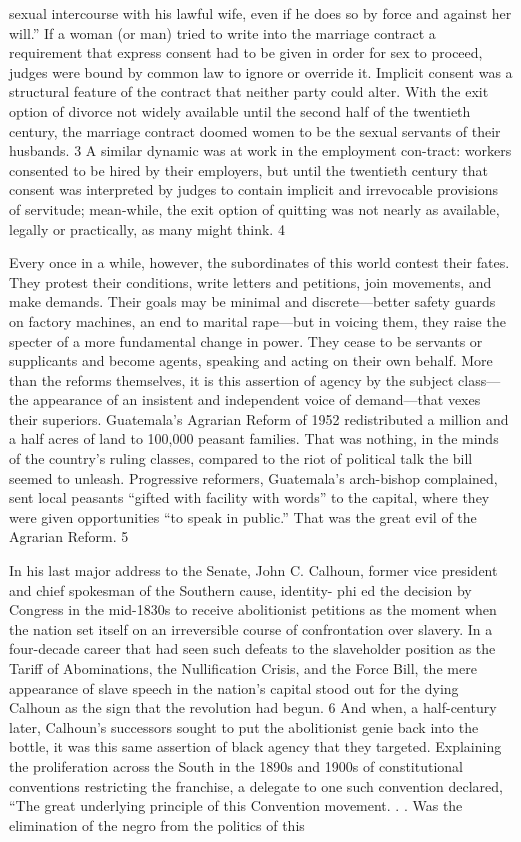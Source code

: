 sexual intercourse with his lawful wife, even if he does so by force and against her will.” If a woman (or man) tried to write into the marriage contract a requirement that express consent had to be given in order for sex to proceed, judges were bound by common law to ignore or override it. Implicit consent was a structural feature of the contract that neither party could alter. With the exit option of divorce not widely available until the second half of the twentieth century, the marriage contract doomed women to be the sexual servants of their husbands. {\color{blue} 3 } A similar dynamic was at work in the employment con-tract: workers consented to be hired by their employers, but until the twentieth century that consent was interpreted by judges to contain implicit and irrevocable provisions of servitude; mean-while, the exit option of quitting was not nearly as available, legally or practically, as many might think. {\color{blue} 4 } {\par} Every once in a while, however, the subordinates of this world contest their fates. They protest their conditions, write letters and petitions, join movements, and make demands. Their goals may be minimal and discrete—better safety guards on factory machines, an end to marital rape—but in voicing them, they raise the specter of a more fundamental change in power. They cease to be servants or supplicants and become agents, speaking and acting on their own behalf. More than the reforms themselves, it is this assertion of agency by the subject class—the appearance of an insistent and independent voice of demand—that vexes their superiors. Guatemala’s Agrarian Reform of 1952 redistributed a million and a half acres of land to 100,000 peasant families. That was nothing, in the minds of the country’s ruling classes, compared to the riot of political talk the bill seemed to unleash. Progressive reformers, Guatemala’s arch-bishop complained, sent local peasants “gifted with facility with words” to the capital, where they were given opportunities “to speak in public.” That was the great evil of the Agrarian Reform. {\color{blue} 5 } {\par} In his last major address to the Senate, John C. Calhoun, former vice president and chief spokesman of the Southern cause, identity- phi ed the decision by Congress in the mid-1830s to receive abolitionist petitions as the moment when the nation set itself on an irreversible course of confrontation over slavery. In a four-decade career that had seen such defeats to the slaveholder position as the Tariff of Abominations, the Nullification Crisis, and the Force Bill, the mere appearance of slave speech in the nation’s capital stood out for the dying Calhoun as the sign that the revolution had begun. {\color{blue} 6 } And when, a half-century later, Calhoun’s successors sought to put the abolitionist genie back into the bottle, it was this same assertion of black agency that they targeted. Explaining the proliferation across the South in the 1890s and 1900s of constitutional conventions restricting the franchise, a delegate to one such convention declared, “The great underlying principle of this Convention movement. . . Was the elimination of the negro from the politics of this 